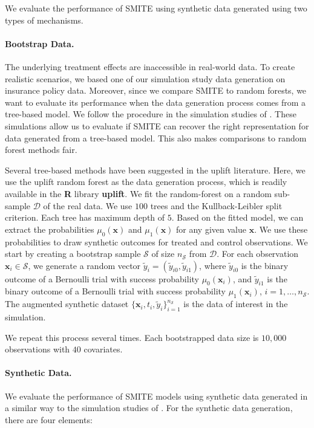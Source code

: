\documentclass{article}
\def\x{\mathbf x}
\begin{document}
We evaluate the performance of SMITE using synthetic data generated using two types of mechanisms.

\paragraph{Bootstrap Data.} The underlying treatment effects are inaccessible in real-world data. To create realistic scenarios, we based one of our simulation study data generation on insurance policy data. Moreover, since we compare SMITE to random forests, we want to evaluate its performance when the data generation process comes from a tree-based model. We follow the procedure in the simulation studies of \cite{belba2019qbased}. These simulations allow us to evaluate if SMITE can recover the right representation for data generated from a tree-based model. This also makes comparisons to random forest methods fair.

Several tree-based methods have been suggested in the uplift literature. Here, we use the uplift random forest \citep{guelman2012random} as the data generation process, which is readily available in the {\bf R} library {\bf uplift}. We fit the random-forest on a random sub-sample $\mathcal{D}$ of the real data. We use $100$ trees and the Kullback-Leibler split criterion. Each tree has maximum depth of $5$. Based on the fitted model, we can extract the probabilities $\mu_0(\x)$ and $\mu_1(\x)$ for any given value $\mathbf{x}$. We use these probabilities to draw synthetic outcomes for treated and control observations. We start by creating a bootstrap sample $\mathcal{S}$ of size $n_\mathcal{S}$ from $\mathcal{D}$. For each observation $\mathbf{x}_i \in \mathcal{S}$, we generate a random vector $\tilde{y}_i =(\tilde{y}_{i0}, \tilde{y}_{i1})$, where $\tilde{y}_{i0}$ is the binary outcome of a Bernoulli trial with success probability $\mu_0(\mathbf{x}_i)$, and  $\tilde{y}_{i1}$ is the binary outcome of a Bernoulli trial with success probability  $\mu_1(\mathbf{x}_i)$, $i=1,\ldots, n_\mathcal{S}$. The augmented synthetic dataset $\{ \x_i , t_i, \tilde{y}_i \}_{i=1}^{n_{\mathcal{S}}}$ is the data of interest in the simulation.

We repeat this process several times. Each bootstrapped data size is $10,000$ observations with $40$ covariates. 

\paragraph{Synthetic Data.} We evaluate the performance of SMITE models using synthetic data generated in a similar way to the simulation studies of \cite{tian2014simple}. For the synthetic data generation, there are four elements:
\end{document}
